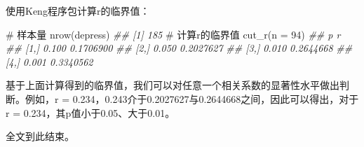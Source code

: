 \documentclass[
  chinese-hans,
  letterpaper,
  DIV=11,
  numbers=noendperiod]{scrartcl}
\newenvironment{Shaded}{\begin{snugshade}}{\end{snugshade}}
\newcommand{\AttributeTok}[1]{\textcolor[rgb]{0.40,0.45,0.13}{#1}}
\newcommand{\CommentTok}[1]{\textcolor[rgb]{0.37,0.37,0.37}{#1}}
\newcommand{\DecValTok}[1]{\textcolor[rgb]{0.68,0.00,0.00}{#1}}
\newcommand{\DocumentationTok}[1]{\textcolor[rgb]{0.37,0.37,0.37}{\textit{#1}}}
\newcommand{\FunctionTok}[1]{\textcolor[rgb]{0.28,0.35,0.67}{#1}}
\newcommand{\NormalTok}[1]{\textcolor[rgb]{0.00,0.23,0.31}{#1}}
\begin{document}
使用Keng程序包计算r的临界值：

\begin{Shaded}
\begin{Highlighting}[numbers=left,,]
\CommentTok{\# 样本量}
\FunctionTok{nrow}\NormalTok{(depress)}
\DocumentationTok{\#\# [1] 185}
\CommentTok{\# 计算r的临界值}
\FunctionTok{cut\_r}\NormalTok{(}\AttributeTok{n =} \DecValTok{94}\NormalTok{)}
\DocumentationTok{\#\#          p         r}
\DocumentationTok{\#\# [1,] 0.100 0.1706900}
\DocumentationTok{\#\# [2,] 0.050 0.2027627}
\DocumentationTok{\#\# [3,] 0.010 0.2644668}
\DocumentationTok{\#\# [4,] 0.001 0.3340562}
\end{Highlighting}
\end{Shaded}

基于上面计算得到的临界值，我们可以对任意一个相关系数的显著性水平做出判断。例如，r
= 0.234，0.243介于0.2027627与0.2644668之间，因此可以得出，对于r =
0.234，其p值小于0.05、大于0.01。

全文到此结束。
\end{document}
